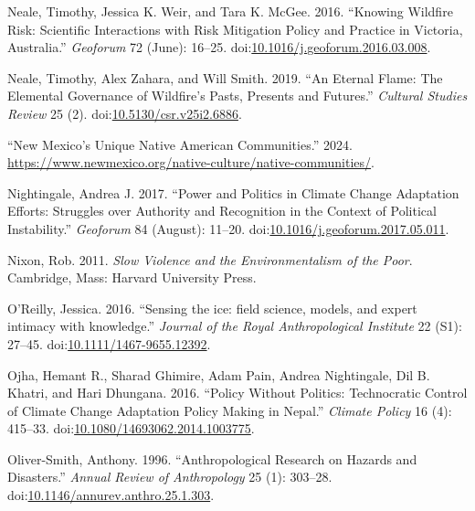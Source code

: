 \documentclass[
]{article}
\newlength{\cslhangindent}
\newenvironment{CSLReferences}[2] %
 {\begin{list}{}{%
  \setlength{\itemindent}{0pt}
  \setlength{\leftmargin}{0pt}
  \setlength{\parsep}{0pt}
  \ifodd #1
   \setlength{\leftmargin}{\cslhangindent}
   \setlength{\itemindent}{-1\cslhangindent}
  \fi
  \setlength{\itemsep}{#2\baselineskip}}}
 {\end{list}}
\begin{document}
\begin{CSLReferences}{1}{0}
Neale, Timothy, Jessica K. Weir, and Tara K. McGee. 2016. {``Knowing Wildfire Risk: {Scientific} Interactions with Risk Mitigation Policy and Practice in {Victoria}, {Australia}.''} \emph{Geoforum} 72 (June): 16--25. doi:\href{https://doi.org/10.1016/j.geoforum.2016.03.008}{10.1016/j.geoforum.2016.03.008}.

Neale, Timothy, Alex Zahara, and Will Smith. 2019. {``An {Eternal Flame}: {The Elemental Governance} of {Wildfire}'s {Pasts}, {Presents} and {Futures}.''} \emph{Cultural Studies Review} 25 (2). doi:\href{https://doi.org/10.5130/csr.v25i2.6886}{10.5130/csr.v25i2.6886}.

{``New {Mexico}'s {Unique Native American Communities}.''} 2024. \url{https://www.newmexico.org/native-culture/native-communities/}.

Nightingale, Andrea J. 2017. {``Power and Politics in Climate Change Adaptation Efforts: {Struggles} over Authority and Recognition in the Context of Political Instability.''} \emph{Geoforum} 84 (August): 11--20. doi:\href{https://doi.org/10.1016/j.geoforum.2017.05.011}{10.1016/j.geoforum.2017.05.011}.

Nixon, Rob. 2011. \emph{Slow Violence and the Environmentalism of the Poor}. Cambridge, Mass: Harvard University Press.

O'Reilly, Jessica. 2016. {``{Sensing the ice: field science, models, and expert intimacy with knowledge}.''} \emph{Journal of the Royal Anthropological Institute} 22 (S1): 27--45. doi:\href{https://doi.org/10.1111/1467-9655.12392}{10.1111/1467-9655.12392}.

Ojha, Hemant R., Sharad Ghimire, Adam Pain, Andrea Nightingale, Dil B. Khatri, and Hari Dhungana. 2016. {``Policy Without Politics: Technocratic Control of Climate Change Adaptation Policy Making in {Nepal}.''} \emph{Climate Policy} 16 (4): 415--33. doi:\href{https://doi.org/10.1080/14693062.2014.1003775}{10.1080/14693062.2014.1003775}.

Oliver-Smith, Anthony. 1996. {``Anthropological {Research} on {Hazards} and {Disasters}.''} \emph{Annual Review of Anthropology} 25 (1): 303--28. doi:\href{https://doi.org/10.1146/annurev.anthro.25.1.303}{10.1146/annurev.anthro.25.1.303}.


\end{CSLReferences}
\end{document}
